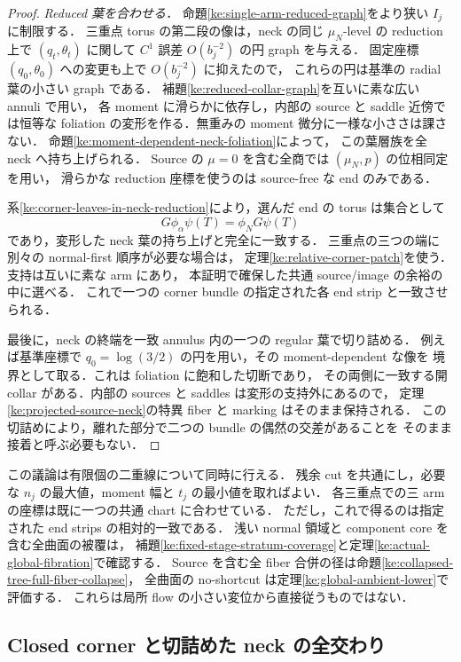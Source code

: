 \begin{proof}
\emph{Reduced 葉を合わせる．}
命題\ref{ke:single-arm-reduced-graph}をより狭い $I_j$ に制限する．
三重点 torus の第二段の像は，neck の同じ $\mu_N$-level の reduction 上で
$(q_t,\theta_t)$ に関して $C^1$ 誤差 $O(b_j^{-2})$ の円 graph を与える．
固定座標 $(q_0,\theta_0)$ への変更も上で $O(b_j^{-2})$ に抑えたので，
これらの円は基準の radial 葉の小さい graph である．
補題\ref{ke:reduced-collar-graph}を互いに素な広い annuli で用い，
各 moment に滑らかに依存し，内部の source と saddle 近傍では恒等な
foliation の変形を作る．無重みの moment 微分に一様な小ささは課さない．
命題\ref{ke:moment-dependent-neck-foliation}によって，
この葉層族を全 neck へ持ち上げられる．
Source の $\mu=0$ を含む全商では $(\mu_N,p)$ の位相同定を用い，
滑らかな reduction 座標を使うのは source-free な end のみである．

系\ref{ke:corner-leaves-in-neck-reduction}により，選んだ end の torus は集合として
\[
 G\phi_\alpha\psi(T)=\phi_N G\psi(T)
\]
であり，変形した neck 葉の持ち上げと完全に一致する．
三重点の三つの端に別々の normal-first 順序が必要な場合は，
定理\ref{ke:relative-corner-patch}を使う．支持は互いに素な arm にあり，
本証明で確保した共通 source/image の余裕の中に選べる．
これで一つの corner bundle の指定された各 end strip と一致させられる．

最後に，neck の終端を一致 annulus 内の一つの regular 葉で切り詰める．
例えば基準座標で $q_0=\log(3/2)$ の円を用い，その moment-dependent な像を
境界として取る．これは foliation に飽和した切断であり，
その両側に一致する開 collar がある．内部の sources と saddles は変形の支持外にあるので，
定理\ref{ke:projected-source-neck}の特異 fiber と marking はそのまま保持される．
この切詰めにより，離れた部分で二つの bundle の偶然の交差があることを
そのまま接着と呼ぶ必要もない．
\end{proof}

この議論は有限個の二重線について同時に行える．
残余 cut を共通にし，必要な $n_j$ の最大値，moment 幅と $t_j$ の最小値を取ればよい．
各三重点での三 arm の座標は既に一つの共通 chart に合わせている．
ただし，これで得るのは指定された end strips の相対的一致である．
浅い normal 領域と component core を含む全曲面の被覆は，
補題\ref{ke:fixed-stage-stratum-coverage}と定理\ref{ke:actual-global-fibration}で確認する．
Source を含む全 fiber 合併の径は命題\ref{ke:collapsed-tree-full-fiber-collapse}，
全曲面の no-shortcut は定理\ref{ke:global-ambient-lower}で評価する．
これらは局所 flow の小さい変位から直接従うものではない．

\subsection{Closed corner と切詰めた neck の全交わり}

